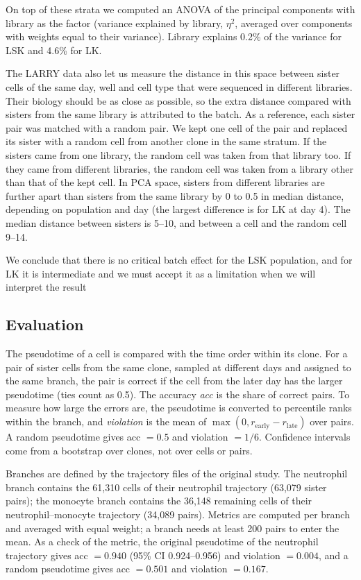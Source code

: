 \documentclass[12pt,a4paper]{article}
\begin{document}
On top of these strata we computed an ANOVA of the principal components with library as the
factor (variance explained by library, $\eta^2$, averaged over components with weights equal to
their variance). Library explains 0.2\% of the variance for LSK and 4.6\% for LK.

The LARRY data also let us measure the distance in this space between sister cells of the
same day, well and cell type that were sequenced in different libraries. Their biology should be
as close as possible, so the extra distance compared with sisters from the same library is
attributed to the batch. As a reference, each sister pair was matched with a random pair. We kept
one cell of the pair and replaced its sister with a random cell from another clone in the same
stratum. If the sisters came from one library, the random cell was taken from that library too.
If they came from different libraries, the random cell was taken from a library other than that
of the kept cell. In PCA space, sisters from different libraries are further apart than sisters
from the same library by 0 to 0.5 in median distance, depending on population and day (the
largest difference is for LK at day 4). The median distance between sisters is 5--10, and
between a cell and the random cell 9--14.

We conclude that there is no critical batch effect for the LSK population, and for LK it is
intermediate and we must accept it as a limitation when we will interpret the result

\subsection{Evaluation}
The pseudotime of a cell is compared with the time order within its clone. For a pair of sister
cells from the same clone, sampled at different days and assigned to the same branch, the pair
is correct if the cell from the later day has the larger pseudotime (ties count as 0.5). The
accuracy \emph{acc} is the share of correct pairs. To measure how large the errors are, the
pseudotime is converted to percentile ranks within the branch, and \emph{violation} is the mean
of $\max(0, r_{\mathrm{early}} - r_{\mathrm{late}})$ over pairs. A random pseudotime gives
acc $=0.5$ and violation $=1/6$. Confidence intervals come from a bootstrap over clones, not over
cells or pairs.

Branches are defined by the trajectory files of the original study. The neutrophil branch
contains the 61{,}310 cells of their neutrophil trajectory (63{,}079 sister pairs); the monocyte
branch contains the 36{,}148 remaining cells of their neutrophil--monocyte trajectory
(34{,}089 pairs). Metrics are computed per branch and averaged with equal weight; a branch needs
at least 200 pairs to enter the mean. As a check of the metric, the original pseudotime of the
neutrophil trajectory gives acc $=0.940$ (95\% CI 0.924--0.956) and violation $=0.004$, and a
random pseudotime gives acc $=0.501$ and violation $=0.167$.
\end{document}
